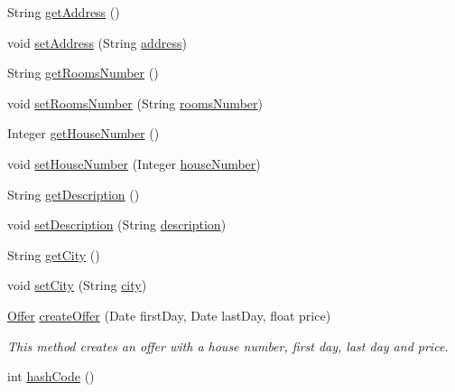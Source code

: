\begin{DoxyCompactItemize}
\item 
String \mbox{\hyperlink{classdomain_1_1_rural_house_a970dabd2796ee789c4feb2cef8fe2df3}{get\+Address}} ()
\item 
void \mbox{\hyperlink{classdomain_1_1_rural_house_a446d24e82bd8abae3be75e39f66bfe57}{set\+Address}} (String \mbox{\hyperlink{classdomain_1_1_rural_house_a6ba346c74cb3404ca6d04a2ebae730d3}{address}})
\item 
String \mbox{\hyperlink{classdomain_1_1_rural_house_a3d0d3fd77f1e271f1af5793ad77f6792}{get\+Rooms\+Number}} ()
\item 
void \mbox{\hyperlink{classdomain_1_1_rural_house_aacf83147c21f7a3c50e883822039ecab}{set\+Rooms\+Number}} (String \mbox{\hyperlink{classdomain_1_1_rural_house_a1cda0eff05ad06090ac37a259fdad562}{rooms\+Number}})
\item 
Integer \mbox{\hyperlink{classdomain_1_1_rural_house_a849faba68dc8c0a71ed936bc509f5568}{get\+House\+Number}} ()
\item 
void \mbox{\hyperlink{classdomain_1_1_rural_house_afae7f7702581e18517472b1faa29273d}{set\+House\+Number}} (Integer \mbox{\hyperlink{classdomain_1_1_rural_house_a1168b2c788d2f3bca3c54eee3b8734cb}{house\+Number}})
\item 
String \mbox{\hyperlink{classdomain_1_1_rural_house_a21b3359aa62984046a4da490fe8895e1}{get\+Description}} ()
\item 
void \mbox{\hyperlink{classdomain_1_1_rural_house_aff9ad2c8f775b473256233e9c26456f1}{set\+Description}} (String \mbox{\hyperlink{classdomain_1_1_rural_house_afdc9d7b70bcc6baa94cae033a5684f0e}{description}})
\item 
String \mbox{\hyperlink{classdomain_1_1_rural_house_a67a45aa0b441b32d455d58c4a42446f1}{get\+City}} ()
\item 
void \mbox{\hyperlink{classdomain_1_1_rural_house_a04f87e3266ab2b0d9b42bb8f947d6172}{set\+City}} (String \mbox{\hyperlink{classdomain_1_1_rural_house_a4ac1bd1de58f97487abbcb8dc27a8077}{city}})
\item 
\mbox{\hyperlink{classdomain_1_1_offer}{Offer}} \mbox{\hyperlink{classdomain_1_1_rural_house_a58e17e08a7b28a75bc1b8e3d6ac01764}{create\+Offer}} (Date first\+Day, Date last\+Day, float price)
\begin{DoxyCompactList}\small\item\em This method creates an offer with a house number, first day, last day and price. \end{DoxyCompactList}\item 
int \mbox{\hyperlink{classdomain_1_1_rural_house_a23272d170821f464d6b07595303c283e}{hash\+Code}} ()

\end{DoxyCompactItemize}
